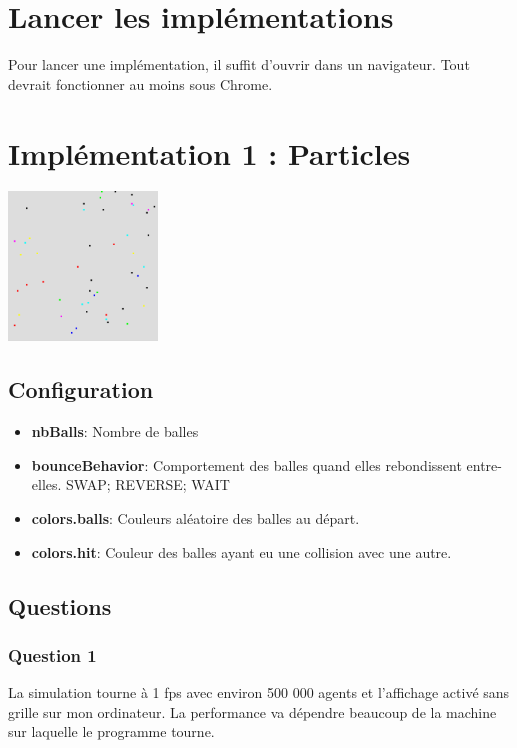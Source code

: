 \documentclass[11pt,a4paper,oneside]{report}
\begin{document}
\section*{Lancer les implémentations}
Pour lancer une implémentation, il suffit d'ouvrir  dans un navigateur. Tout devrait fonctionner au moins sous Chrome.

\newpage

\section*{Implémentation 1 : Particles}

\begin{center}
\includegraphics[width=150px]{particles}
\end{center}

\subsection*{Configuration}
\begin{itemize}
\item \textbf{nbBalls}: Nombre de balles
\item \textbf{bounceBehavior}: Comportement des balles quand elles rebondissent entre-elles. SWAP; REVERSE; WAIT
\item \textbf{colors.balls}: Couleurs aléatoire des balles au départ.
\item \textbf{colors.hit}: Couleur des balles ayant eu une collision avec une autre.
\end{itemize}

\subsection*{Questions}
\subsubsection*{Question 1}
La simulation tourne à 1 fps avec environ 500 000 agents et l'affichage activé sans grille sur mon ordinateur. La performance va dépendre beaucoup de la machine sur laquelle le programme tourne.
\end{document}
